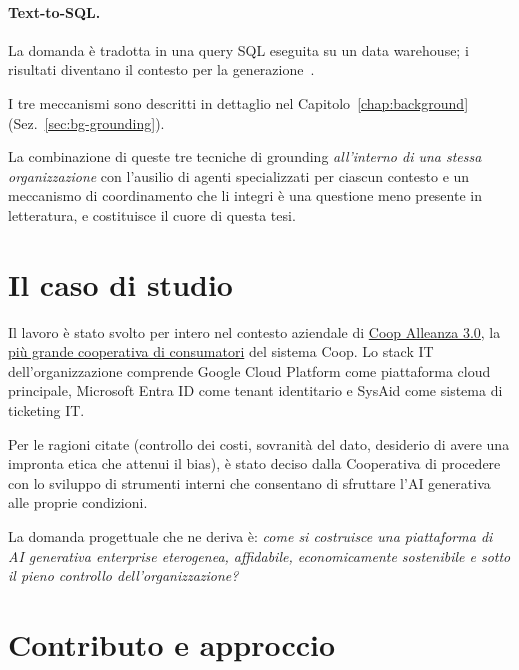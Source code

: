 \paragraph{Text-to-SQL.} La domanda è tradotta in una query SQL eseguita su un data warehouse; i risultati diventano il contesto per la generazione~\cite{yu2018spider,pourreza2023dinsql}.

I tre meccanismi sono descritti in dettaglio nel Capitolo~\ref{chap:background} (Sez.~\ref{sec:bg-grounding}).

La combinazione di queste tre tecniche di grounding \emph{all'interno di una stessa organizzazione} con l'ausilio di agenti specializzati per ciascun contesto 
e un meccanismo di coordinamento che li integri è una questione meno presente in letteratura, e costituisce il cuore di questa tesi.

\section{Il caso di studio}
\label{sec:caso-studio}

Il lavoro è stato svolto per intero nel contesto aziendale di
\href{https://www.coopalleanza3-0.it}{Coop Alleanza 3.0}, la 
\href{https://it.wikipedia.org/wiki/Coop_Alleanza_3.0}{più grande cooperativa di consumatori} del sistema Coop.
Lo stack IT dell'organizzazione comprende Google Cloud Platform come piattaforma cloud principale, 
Microsoft Entra ID come tenant identitario e SysAid come sistema di ticketing IT.

Per le ragioni citate (controllo dei costi, sovranità del dato, desiderio di avere una impronta etica che attenui il bias), è stato deciso dalla Cooperativa
di procedere con lo sviluppo di strumenti interni che consentano di sfruttare l'AI generativa alle proprie condizioni.

La domanda progettuale che ne deriva è: \emph{come si costruisce una piattaforma di AI generativa enterprise eterogenea, affidabile, economicamente sostenibile e sotto il pieno controllo dell'organizzazione?}

\section{Contributo e approccio}
\label{sec:contributi}

